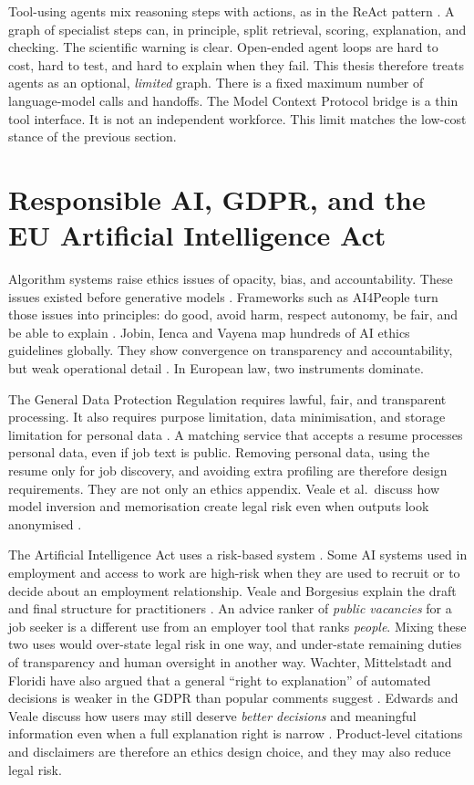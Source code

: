 Tool-using agents mix reasoning steps with actions, as in the ReAct pattern . A graph of specialist steps can, in principle, split retrieval, scoring, explanation, and checking. The scientific warning is clear. Open-ended agent loops are hard to cost, hard to test, and hard to explain when they fail. This thesis therefore treats agents as an optional, \emph{limited} graph. There is a fixed maximum number of language-model calls and handoffs. The Model Context Protocol bridge is a thin tool interface. It is not an independent workforce. This limit matches the low-cost stance of the previous section.

\section{Responsible AI, GDPR, and the EU Artificial Intelligence Act}
\label{sec:responsible}

Algorithm systems raise ethics issues of opacity, bias, and accountability. These issues existed before generative models . Frameworks such as AI4People turn those issues into principles: do good, avoid harm, respect autonomy, be fair, and be able to explain . Jobin, Ienca and Vayena map hundreds of AI ethics guidelines globally. They show convergence on transparency and accountability, but weak operational detail . In European law, two instruments dominate.

The General Data Protection Regulation requires lawful, fair, and transparent processing. It also requires purpose limitation, data minimisation, and storage limitation for personal data . A matching service that accepts a resume processes personal data, even if job text is public. Removing personal data, using the resume only for job discovery, and avoiding extra profiling are therefore design requirements. They are not only an ethics appendix. Veale et al.\ discuss how model inversion and memorisation create legal risk even when outputs look anonymised .

The Artificial Intelligence Act uses a risk-based system . Some AI systems used in employment and access to work are high-risk when they are used to recruit or to decide about an employment relationship. Veale and Borgesius explain the draft and final structure for practitioners . An advice ranker of \emph{public vacancies} for a job seeker is a different use from an employer tool that ranks \emph{people}. Mixing these two uses would over-state legal risk in one way, and under-state remaining duties of transparency and human oversight in another way. Wachter, Mittelstadt and Floridi have also argued that a general ``right to explanation'' of automated decisions is weaker in the GDPR than popular comments suggest . Edwards and Veale discuss how users may still deserve \emph{better decisions} and meaningful information even when a full explanation right is narrow . Product-level citations and disclaimers are therefore an ethics design choice, and they may also reduce legal risk.


